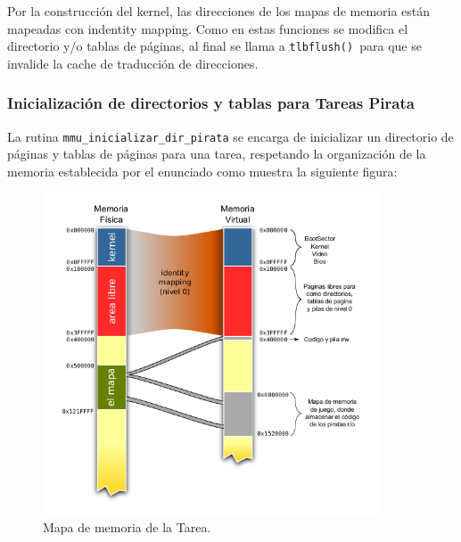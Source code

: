 \par Por la construcción del kernel, las direcciones de los mapas de memoria están mapeadas con indentity mapping. Como en estas funciones se modifica el directorio y/o tablas de páginas, al final se llama a \texttt{tlbflush() }para que se invalide la cache de traducción de direcciones. 

\subsubsection*{Inicialización de directorios y tablas para Tareas Pirata}

\par La rutina \texttt{mmu_inicializar_dir_pirata} se encarga de inicializar un directorio de páginas y tablas de páginas para una tarea, respetando la organización de la memoria establecida por el enunciado como muestra la siguiente figura:

\begin{figure}[ht!]
\centering
\includegraphics[width=100mm]{imagenes/memoriatarea.png}
\caption{Mapa de memoria de la Tarea.}
\end{figure}

